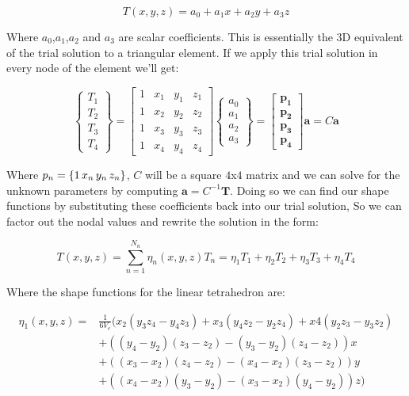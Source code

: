 \documentclass[12pt]{article}
\begin{document}
\begin{equation}
T(x,y,z) = a_0+a_1x+a_2y+a_3z
\end{equation}

Where $a_0$,$a_1$,$a_2$ and $a_3$ are scalar coefficients. This is essentially the 3D equivalent of the trial solution to a triangular element. If we apply this trial solution in every node of the element we'll get:

\begin{equation}
\begin{Bmatrix} T_1 \\ T_2 \\ T_3 \\ T_4 \end{Bmatrix} = 
\begin{bmatrix} 1 & x_1 & y_1 & z_1 \\ 1 & x_2 & y_2 & z_2 \\ 1 & x_3 & y_3 & z_3 \\ 1 & x_4 & y_4 & z_4\end{bmatrix}
\begin{Bmatrix} a_0 \\ a_1 \\ a_2 \\ a_3 \end{Bmatrix} =
\begin{bmatrix} \mathbf{p_1} \\ \mathbf{p_2} \\ \mathbf{p_3} \\ \mathbf{p_4} \end{bmatrix}\mathbf{a} = C\mathbf{a}
\end{equation}

Where $p_n=\{1 \thinspace x_n \thinspace y_n \thinspace z_n\}$, $C$ will be a square $4$x$4$ matrix and we can solve for the unknown parameters by computing $\mathbf{a}=C^{-1}\mathbf{T}$. Doing so we can find our shape functions by substituting these coefficients back into our trial solution, So we can factor out the nodal values and rewrite the solution in the form:

\begin{equation}
T(x,y,z) = \sum_{n=1}^{N_n} \eta_n{(x,y,z)} T_n = \eta_1 T_1 + \eta_2 T_2 + \eta_3 T_3 + \eta_4 T_4
\end{equation}

Where the shape functions for the linear tetrahedron are:

\begin{align*}
\eta_1(x,y,z)=&\frac{1}{6V_e}(
x_2(y_3z_4-y_4z_3)+x_3(y_4z_2-y_2z_4)+x4(y_2z_3-y_3z_2) \\
&+ ((y_4-y_2)(z_3-z_2)-(y_3-y_2)(z_4-z_2))x \\
&+ ((x_3-x_2)(z_4-z_2)-(x_4-x_2)(z_3-z_2))y \\
&+ ((x_4-x_2)(y_3-y_2)-(x_3-x_2)(y_4-y_2))z)
\end{align*}
\end{document}
